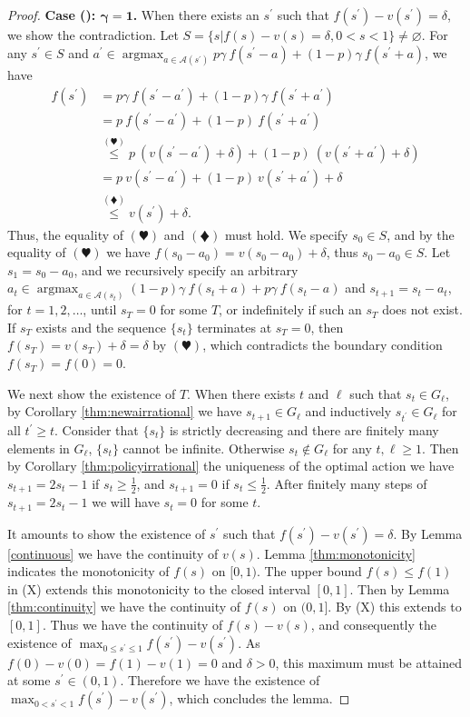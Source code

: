 \documentclass{article}
\theoremstyle{named}
\DeclareMathOperator*{\argmax}{arg max}
\newcommand{\cA}{\mathcal{A}}
\begin{document}
\begin{proof}
\textbf{Case (): $\bm{\gamma=1}$.}
When there exists an $s^\prime$ such that $f(s^\prime)-v(s^\prime)=\delta$, we show the contradiction. Let $S=\{s|f(s)-v(s)=\delta, 0<s<1\}\neq \varnothing$. For any $s^\prime\in S$ and $a^\prime\in\argmax_{a\in\cA(s^\prime)}p\gamma\ f(s^\prime-a)+(1-p)\gamma\ f(s^\prime+a)$, we have
\begin{align*}
f(s^\prime) &= p\gamma\ f(s^\prime-a^\prime)+(1-p)\gamma\ f(s^\prime+a^\prime) \\
&= p\ f(s^\prime-a^\prime)+(1-p)\ f(s^\prime+a^\prime) \\
&\stackrel{(\varheart)}{\leq} p\ (v(s^\prime-a^\prime)+\delta)+(1-p)\ (v(s^\prime+a^\prime)+\delta) \\
& = p\ v(s^\prime-a^\prime)+(1-p)\ v(s^\prime+a^\prime)+\delta \\
& \stackrel{(\vardiamond)}{\leq} v(s^\prime) + \delta.
\end{align*}
Thus, the equality of $(\varheart)$ and $(\vardiamond)$ must hold. We specify $s_0\in S$, and by the equality of $(\varheart)$ we have $f(s_0-a_0) = v(s_0-a_0)+\delta$, thus $s_0-a_0\in S$. Let $s_1=s_0-a_0$, and we recursively specify an arbitrary $a_t\in\argmax_{a\in\cA(s_t)}(1-p)\gamma\ f(s_t+a)+p\gamma\ f(s_t-a)$ and $s_{t+1}=s_t-a_t$, for $t=1,2,\dots$, until $s_T=0$ for some $T$, or indefinitely if such an $s_T$ does not exist. If $s_T$ exists and the sequence $\{s_t\}$ terminates at $s_T=0$, then $f(s_T) = v(s_T)+\delta=\delta$ by $(\varheart)$, which contradicts the boundary condition $f(s_T)=f(0)=0$. 

We next show the existence of $T$. 
When there exists $t$ and $\ell$ such that $s_t\in G_\ell$, by Corollary \ref{thm:newairrational} we have $s_{t+1}\in G_\ell$ and inductively $s_{t^\prime} \in G_\ell$ for all $t^\prime\geq t$. 
Consider that $\{s_t\}$ is strictly decreasing and there are finitely many elements in $G_\ell$, $\{s_t\}$ cannot be infinite.
Otherwise $s_t\notin G_\ell$ for any $t,\ell \geq 1$. Then by Corollary \ref{thm:policyirrational} the uniqueness of the optimal action we have $s_{t+1}=2s_t-1$ if $s_t\geq \frac{1}{2}$, and $s_{t+1}=0$ if $s_t\leq \frac{1}{2}$. 
After finitely many steps of $s_{t+1}=2s_t-1$ we will have $s_t=0$ for some $t$.

It amounts to show the existence of $s^\prime$ such that $f(s^\prime)-v(s^\prime)=\delta$. By Lemma \ref{continuous} we have the continuity of $v(s)$. Lemma \ref{thm:monotonicity} indicates the monotonicity of $f(s)$ on $[0,1)$. The upper bound $f(s)\leq f(1)$ in ({X}) extends this monotonicity to the closed interval $[0,1]$. Then by Lemma \ref{thm:continuity} we have the continuity of $f(s)$ on $(0,1]$. By ({X}) this extends to $[0,1]$. Thus we have the continuity of $f(s)-v(s)$, and consequently the existence of $\max_{0\leq s^\prime\leq 1} f(s^\prime)-v(s^\prime)$. As $f(0)-v(0)=f(1)-v(1)=0$ and $\delta>0$, this maximum must be attained at some $s^\prime\in(0,1)$. Therefore we have the existence of $\max_{0< s^\prime< 1} f(s^\prime)-v(s^\prime)$, which concludes the lemma.
\end{proof}
\end{document}
